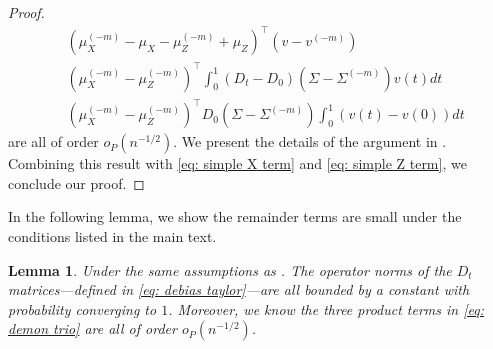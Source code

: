 \documentclass[11pt]{article}
\newtheorem{lemma}[theorem]{Lemma}
\begin{document}
\begin{proof}
\begin{equation}
\begin{aligned}
&\left(\mu_X^{(-m)}-\mu_X-\mu_Z^{(-m)}+\mu_Z\right)^{\top}\left(v-v^{(-m)}\right)\\
   & \left(\mu_X^{(-m)}-\mu_Z^{(-m)}\right)^{\top}\int_0^1(D_t-D_0)\left(\Sigma-\Sigma^{(-m)}\right) v(t) d t\\
   & \left(\mu_X^{(-m)}-\mu_Z^{(-m)}\right)^{\top}D_0\left(\Sigma-\Sigma^{(-m)}\right) \int_0^1(v(t)-v(0)) d t
\end{aligned}
\end{equation}
 are all of order $o_P(n^{-1/2})$. We present the details of the argument in . Combining this result with \eqref{eq: simple X term} and \eqref{eq: simple Z term}, we conclude our proof.
\end{proof}

In the following lemma, we show the remainder terms are small under the conditions listed in the main text.
\begin{lemma}\label{lemma: bound terms in remainder}
Under the same assumptions as . The operator norms of the $D_t$ matrices---defined in \eqref{eq: debias taylor}---are all bounded by a constant with probability converging to $1$. Moreover, we know the three product terms in \eqref{eq: demon trio} are all of order $o_P(n^{-1/2})$.
\end{lemma}
\end{document}
